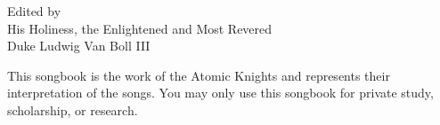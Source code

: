 \documentclass[11pt,a5paper,wordbk]{../SSSongbook}
\begin{document}
\let\cleardoublepage\clearpage %

{Edited by\\
  His Holiness, the Enlightened and Most Revered\\
Duke Ludwig Van Boll III}

\ifChordBk
\let\cleardoublepage\clearpage %
\fancyhead[R,L]{}
\tableofcontents %
\vfil
This songbook is the work of the Atomic Knights
and represents their interpretation of the songs.
You may only use this songbook for private study,
scholarship, or research.\par
\pagebreak
\fi








\ifChordBk
\printindex
\fi
\end{document}
